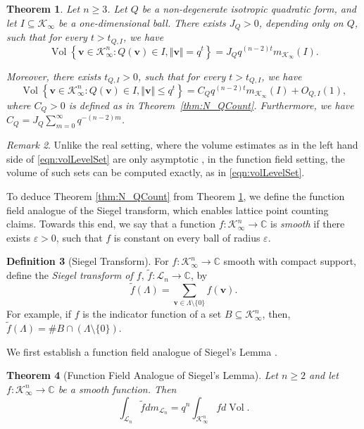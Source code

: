 \documentclass[11pt,a4paper,reqno]{amsart}
\newtheorem{theorem}{Theorem}[section]
\theoremstyle{definition}
\newtheorem{definition}[theorem]{Definition}
\theoremstyle{remark}
\newtheorem{remark}[theorem]{Remark}
\numberwithin{equation}{section}
\begin{document}
\begin{theorem}
    \label{thm:VolEstimate}
    Let $n\ge 3$.
    Let $Q$ be a non-degenerate isotropic quadratic form, and let $I\subseteq \mathcal{K}_{\infty}$ be a one-dimensional ball. There exists $J_Q>0$, depending only on $Q$, such that for every $t>t_{Q,I}$, we have \begin{equation}\label{eqn:volLevelSet}\operatorname{Vol}\left\{\mathbf{v}\in \mathcal{K}_{\infty}^n:Q(\mathbf{v})\in I,\Vert \mathbf{v}\Vert=q^t\right\}=J_Qq^{(n-2)t}m_{\mathcal{K}_{\infty}}(I).\end{equation}
    
    Moreover, there exists $t_{Q,I}>0$, such that for every $t>t_{Q,I}$, we have 
    $$\operatorname{Vol}\left\{\mathbf{v}\in \mathcal{K}_{\infty}^n:Q(\mathbf{v})\in I,\Vert \mathbf{v}\Vert\leq q^t\right\}=C_Qq^{(n-2)t}m_{\mathcal{K}_{\infty}}(I)+O_{Q,I}(1),$$
where $C_Q>0$ is defined as in Theorem~\ref{thm:N_QCount}. Furthermore, we have $C_Q=J_Q\sum_{m=0}^{\infty}q^{-(n-2)m}$.
\end{theorem}
\begin{remark}
    Unlike the real setting, where the volume estimates as in the left hand side of \eqref{eqn:volLevelSet} are only asymptotic \cite{KY,HLM,Han3-4}, in the function field setting, the volume of such sets can be computed exactly, as in \eqref{eqn:volLevelSet}.
\end{remark}
To deduce Theorem \ref{thm:N_QCount} from Theorem \ref{thm:VolEstimate}, we define the function field analogue of the Siegel transform, which enables lattice point counting claims. Towards this end, we say that a function $f:\mathcal{K}_{\infty}^n\rightarrow \mathbb{C}$ is \emph{smooth} if there exists $\varepsilon>0$, such that $f$ is constant on every ball of radius $\varepsilon$. 
\begin{definition}[Siegel Transform]
    For $f:\mathcal{K}_{\infty}^n\rightarrow \mathbb{C}$ smooth with compact support, define the \emph{Siegel transform of $f$}, $\widetilde{f}:\mathcal{L}_n\rightarrow \mathbb{C}$, by $$\widetilde{f}(\Lambda)=\sum_{\mathbf{v}\in \Lambda\setminus\{0\}}f(\mathbf{v}).$$
    For example, if $f$ is the indicator function of a set $B\subseteq \mathcal{K}_{\infty}^n$, then, $\widetilde{f}(\Lambda)=\#B\cap (\Lambda\setminus \{0\})$. 
\end{definition}
We first establish a function field analogue of Siegel's Lemma \cite{Sie}.
\begin{theorem}[Function Field Analogue of Siegel's Lemma]
\label{thm:Siegel}
Let $n\geq 2$ and let $f:\mathcal{K}_{\infty}^n\rightarrow \mathbb{C}$ be a smooth function. Then 
\begin{equation}
\label{eqn:SiegelFormula}\int_{\mathcal{L}_n}\widetilde{f}dm_{\mathcal{L}_n}=q^n\int_{\mathcal{K}_{\infty}^n}fd\operatorname{Vol}.\end{equation}
\end{theorem}
\end{document}
